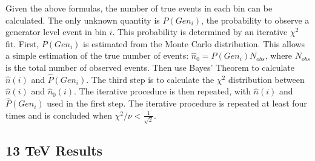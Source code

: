 \qquad Given the above formulas, the number of true events in each bin can be calculated. The only unknown quantity is $P(Gen_{i})$, the probability to observe a generator level event in bin $i$. This probability is determined by an iterative $\chi^2$ fit. First, $P(Gen_{i})$ is estimated from the Monte Carlo distribution. This allows a simple estimation of the true number of events: $\hat{n}_{0} = P(Gen_{i})N_{obs}$, where $N_{obs}$ is the total number of observed events. Then use Bayes' Theorem to calculate $\hat{n}(i)$ and $\hat{P}(Gen_{i})$. The third step is to calculate the $\chi^{2}$ distribution between $\hat{n}(i)$ and $\hat{n}_{0}(i)$. The iterative procedure is then repeated, with $\hat{n}(i)$ and $\hat{P}(Gen_{i})$ used in the first step. The iterative procedure is repeated at least four times and is concluded when $\chi^{2}/\nu < \frac{1}{\sqrt{2}}$.

\subsection{13 TeV Results}